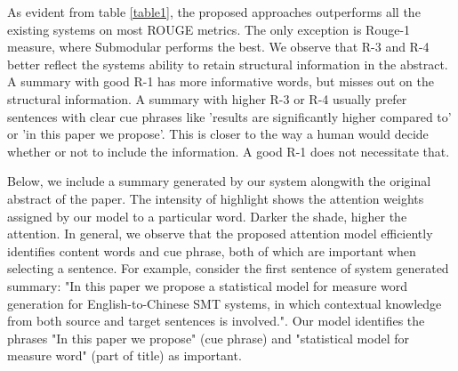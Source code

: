 As evident from table \ref{table1}, the proposed approaches outperforms all the existing systems on most ROUGE metrics. The only exception is Rouge-1 measure, where Submodular performs the best. We observe that R-3 and R-4 better reflect the systems ability to retain structural information in the abstract. A summary with good R-1 has more informative words, but misses out on the structural information. A summary with higher R-3 or R-4 usually prefer sentences with clear cue phrases like 'results are significantly higher compared to' or 'in this paper we propose'. This is closer to the way a human would decide whether or not to include  the information. A good R-1 does not necessitate that.

Below, we include a summary generated by our system alongwith the original abstract of the paper. The intensity of highlight shows the attention weights assigned by our model to a particular word. Darker the shade, higher the attention. In general, we observe that the proposed attention model efficiently identifies content words and cue phrase, both of which are important when selecting a sentence. For example, consider the first sentence of system generated summary: "In this paper we propose a statistical model for measure word generation for English-to-Chinese SMT systems, in which contextual knowledge from both source and target sentences is involved.". Our model identifies the phrases "In this paper we propose" (cue phrase) and "statistical model for measure word" (part of title) as important. 
\vspace{-2mm}
